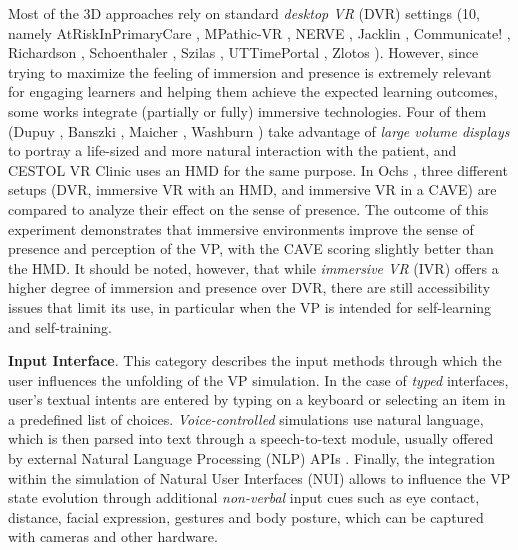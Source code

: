 Most of the 3D approaches rely on standard \emph{desktop VR} (DVR) settings (10, namely AtRiskInPrimaryCare \cite{albright2018using}, MPathic-VR \cite{guetterman2019medical,kron2017using}, NERVE \cite{hirumi2016advancingPart2,hirumi2016advancing,kleinsmith2015understanding}, Jacklin \cite{jacklin2019virtual,jacklin2018improving}, Communicate! \cite{jeuring2015communicate}, Richardson \cite{richardson2019virtual}, Schoenthaler \cite{schoenthaler2017simulated}, Szilas \cite{szilas2019virtual}, UTTimePortal \cite{zielke2016beyond,zielke2016using}, Zlotos \cite{zlotos2016scenario}). However, since trying to maximize the feeling of immersion and presence is extremely relevant for engaging learners and helping them achieve the expected learning outcomes, some works integrate (partially or fully) immersive technologies. Four of them (Dupuy \cite{dupuy2019virtual}, Banszki \cite{banszki2018clinical,quail2016student}, Maicher \cite{maicher2017developing}, Washburn \cite{washburn2020virtual}) take advantage of \emph{large volume displays}  to portray a life-sized and more natural interaction with the patient, and CESTOL VR Clinic \cite{sapkaroski2018implementation} uses an HMD for the same purpose. In Ochs \cite{ochs2019training}, three different setups (DVR, immersive VR with an HMD, and immersive VR in a CAVE) are compared to analyze their effect on the sense of presence. The outcome of this experiment demonstrates that immersive environments improve the sense of presence and perception of the VP, with the CAVE scoring slightly better than the HMD.
It should be noted, however, that while \emph{immersive VR} (IVR) offers a higher degree of immersion and presence over DVR, there are still accessibility issues that limit its use, in particular when the VP is intended for self-learning and self-training.


\textbf{Input Interface}. This category describes the input methods through which the user influences the unfolding of the VP simulation.
In the case of \emph{typed} interfaces, user's textual intents are entered by typing on a keyboard or selecting an item in a predefined list of choices.
\emph{Voice-controlled} simulations use natural language, which is then parsed into text through a speech-to-text module, usually offered by external Natural Language Processing (NLP) APIs \cite{foster2016using,maicher2017developing}. 
Finally, the integration within the simulation of Natural User Interfaces (NUI) allows to influence the VP state evolution through additional \textit{non-verbal} input cues such as eye contact, distance, facial expression, gestures and body posture, which can be captured with cameras and other hardware. %


